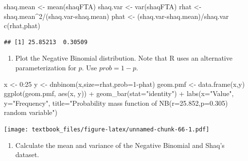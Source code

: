 \documentclass[
  11pt,
]{book}
\newenvironment{Shaded}{\begin{snugshade}}{\end{snugshade}}
\newcommand{\AttributeTok}[1]{\textcolor[rgb]{0.77,0.63,0.00}{#1}}
\newcommand{\DecValTok}[1]{\textcolor[rgb]{0.00,0.00,0.81}{#1}}
\newcommand{\FunctionTok}[1]{\textcolor[rgb]{0.00,0.00,0.00}{#1}}
\newcommand{\NormalTok}[1]{#1}
\newcommand{\OtherTok}[1]{\textcolor[rgb]{0.56,0.35,0.01}{#1}}
\newcommand{\SpecialCharTok}[1]{\textcolor[rgb]{0.00,0.00,0.00}{#1}}
\newcommand{\StringTok}[1]{\textcolor[rgb]{0.31,0.60,0.02}{#1}}
\providecommand{\tightlist}{%
  \setlength{\itemsep}{0pt}\setlength{\parskip}{0pt}}
\theoremstyle{definition}
\theoremstyle{definition}
\theoremstyle{definition}
\theoremstyle{definition}
\theoremstyle{remark}
\begin{document}
\begin{Shaded}
\begin{Highlighting}[]
\NormalTok{shaq.mean }\OtherTok{\textless{}{-}} \FunctionTok{mean}\NormalTok{(shaqFTA)}
\NormalTok{shaq.var }\OtherTok{\textless{}{-}} \FunctionTok{var}\NormalTok{(shaqFTA)}
\NormalTok{rhat }\OtherTok{\textless{}{-}}\NormalTok{ shaq.mean}\SpecialCharTok{\^{}}\DecValTok{2}\SpecialCharTok{/}\NormalTok{(shaq.var}\SpecialCharTok{{-}}\NormalTok{shaq.mean)}
\NormalTok{phat }\OtherTok{\textless{}{-}}\NormalTok{ (shaq.var}\SpecialCharTok{{-}}\NormalTok{shaq.mean)}\SpecialCharTok{/}\NormalTok{shaq.var}
\FunctionTok{c}\NormalTok{(rhat,phat)}
\end{Highlighting}
\end{Shaded}

\begin{verbatim}
## [1] 25.85213  0.30509
\end{verbatim}

\begin{enumerate}
\def\labelenumi{(\alph{enumi})}
\setcounter{enumi}{1}
\tightlist
\item
  Plot the Negative Binomial distribution. Note that R uses an alternative parameterization for \(p\). Use \(prob = 1-p\).
\end{enumerate}

\begin{Shaded}
\begin{Highlighting}[]
\NormalTok{x }\OtherTok{\textless{}{-}} \DecValTok{0}\SpecialCharTok{:}\DecValTok{25}
\NormalTok{y }\OtherTok{\textless{}{-}} \FunctionTok{dnbinom}\NormalTok{(x,}\AttributeTok{size=}\NormalTok{rhat,}\AttributeTok{prob=}\DecValTok{1}\SpecialCharTok{{-}}\NormalTok{phat)}
\NormalTok{geom.pmf }\OtherTok{\textless{}{-}} \FunctionTok{data.frame}\NormalTok{(x,y)}
\FunctionTok{ggplot}\NormalTok{(geom.pmf, }\FunctionTok{aes}\NormalTok{(x, y)) }\SpecialCharTok{+} 
  \FunctionTok{geom\_bar}\NormalTok{(}\AttributeTok{stat=}\StringTok{"identity"}\NormalTok{) }\SpecialCharTok{+} 
  \FunctionTok{labs}\NormalTok{(}\AttributeTok{x=}\StringTok{"Value"}\NormalTok{, }\AttributeTok{y=}\StringTok{"Frequency"}\NormalTok{, }\AttributeTok{title=}\StringTok{"Probability mass function of NB(r=25.852,p=0.305) random variable"}\NormalTok{)}
\end{Highlighting}
\end{Shaded}

\texttt{[image: textbook\_files/figure-latex/unnamed-chunk-66-1.pdf]}

\begin{enumerate}
\def\labelenumi{(\alph{enumi})}
\setcounter{enumi}{2}
\tightlist
\item
  Calculate the mean and variance of the Negative Binomial and Shaq's dataset.
\end{enumerate}
\end{document}
